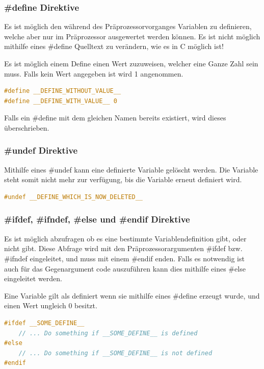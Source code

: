 \subsubsection{\#define Direktive}

Es ist m\"oglich den w\"ahrend des Pr\"aprozessorvorganges Variablen zu definieren, welche aber nur im Pr\"aprozessor ausgewertet werden k\"onnen. Es ist nicht m\"oglich mithilfe eines \#define Quelltext zu ver\"andern, wie es in C m\"oglich ist!

Es ist m\"oglich einem Define einen Wert zuzuweisen, welcher eine Ganze Zahl sein muss. Falls kein Wert angegeben ist wird 1 angenommen.

\begin{lstlisting}[language=C]
#define __DEFINE_WITHOUT_VALUE__
#define __DEFINE_WITH_VALUE__ 0
\end{lstlisting}

Falls ein \#define mit dem gleichen Namen bereits existiert, wird dieses \"uberschrieben.

\subsubsection{\#undef Direktive}

Mithilfe eines \#undef kann eine definierte Variable gel\"oscht werden. Die Variable steht somit nicht mehr zur verf\"ugung, bis die Variable erneut definiert wird.

\begin{lstlisting}[language=C]
#undef __DEFINE_WHICH_IS_NOW_DELETED__
\end{lstlisting}

\subsubsection{\#ifdef, \#ifndef, \#else und \#endif Direktive}

Es ist m\"oglich abzufragen ob es eine bestimmte Variablendefinition gibt, oder nicht gibt. Diese Abfrage wird mit den Pr\"aprozessorargumenten \#ifdef bzw. \#ifndef eingeleitet, und muss mit einem \#endif enden. Falls es notwendig ist auch f\"ur das Gegenargument code auszuf\"uhren kann dies mithilfe eines \#else eingeleitet werden.

Eine Variable gilt als definiert wenn sie mithilfe eines \#define erzeugt wurde, und einen Wert ungleich 0 besitzt.

\begin{lstlisting}[language=C]
#ifdef __SOME_DEFINE__
	// ... Do something if __SOME_DEFINE__ is defined
#else
	// ... Do something if __SOME_DEFINE__ is not defined
#endif
\end{lstlisting}

